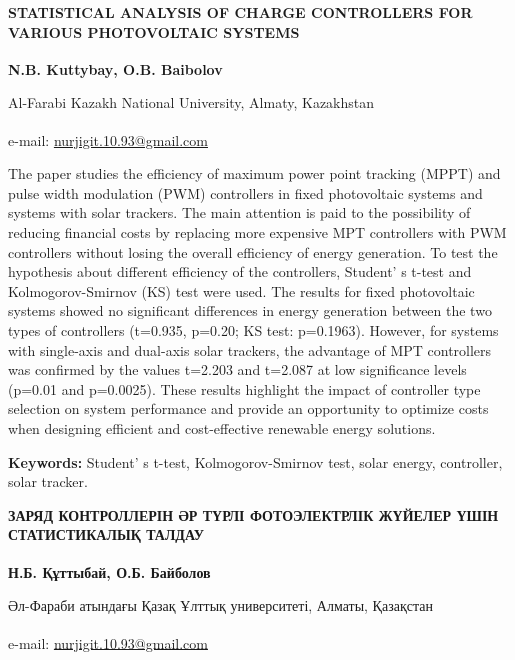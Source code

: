 \begin{articleheader}
{\bfseries STATISTICAL ANALYSIS OF CHARGE CONTROLLERS FOR VARIOUS
PHOTOVOLTAIC SYSTEMS}

{\bfseries
N.B. Kuttybay\textsuperscript{\envelope },
O.B. Baibolov
}
\end{articleheader}

\begin{affiliation}
Al-Farabi Kazakh National University, Almaty, Kazakhstan

\textsuperscript{\envelope }e-mail: \href{mailto:nurjigit.10.93@gmail.com}{nurjigit.10.93@gmail.com}
\end{affiliation}

The paper studies the efficiency of maximum power point tracking (MPPT)
and pulse width modulation (PWM) controllers in fixed photovoltaic
systems and systems with solar trackers. The main attention is paid to
the possibility of reducing financial costs by replacing more expensive
MPT controllers with PWM controllers without losing the overall
efficiency of energy generation. To test the hypothesis about different
efficiency of the controllers, Student' s t-test and
Kolmogorov-Smirnov (KS) test were used. The results for fixed
photovoltaic systems showed no significant differences in energy
generation between the two types of controllers (t=0.935, p=0.20; KS
test: p=0.1963). However, for systems with single-axis and dual-axis
solar trackers, the advantage of MPT controllers was confirmed by the
values \hspace{0pt}\hspace{0pt}t=2.203 and t=2.087 at low significance
levels (p=0.01 and p=0.0025). These results highlight the impact of
controller type selection on system performance and provide an
opportunity to optimize costs when designing efficient and
cost-effective renewable energy solutions.

{\bfseries Keywords:} Student' s t-test, Kolmogorov-Smirnov
test, solar energy, controller, solar tracker.

\begin{articleheader}
{\bfseries ЗАРЯД КОНТРОЛЛЕРІН ӘР ТҮРЛІ ФОТОЭЛЕКТРЛІК ЖҮЙЕЛЕР ҮШІН
СТАТИСТИКАЛЫҚ ТАЛДАУ}

{\bfseries
Н.Б. Құттыбай\textsuperscript{\envelope },
О.Б. Байболов}
\end{articleheader}

\begin{affiliation}
Әл-Фараби атындағы Қазақ Ұлттық университеті, Алматы, Қазақстан

\textsuperscript{\envelope }e-mail: \href{mailto:nurjigit.10.93@gmail.com}{nurjigit.10.93@gmail.com}
\end{affiliation}

